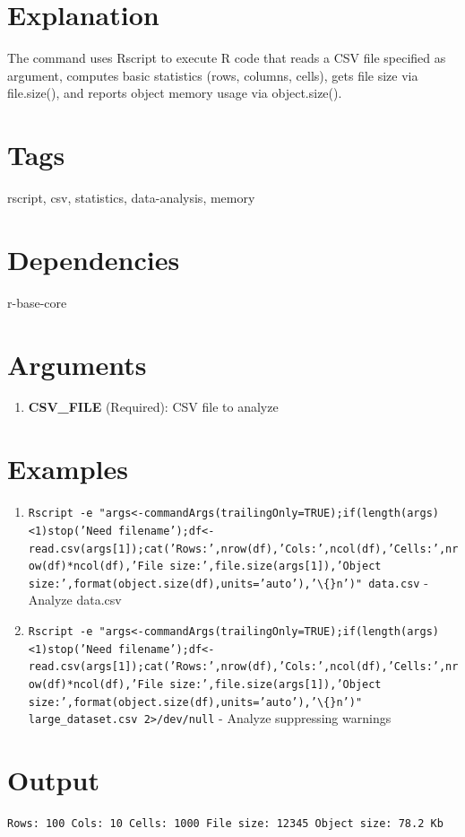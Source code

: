 \documentclass[openany]{book}
\begin{document}
\section*{Explanation}
The command uses Rscript to execute R code that reads a CSV file specified as argument, computes basic statistics (rows, columns, cells), gets file size via file.size(), and reports object memory usage via object.size().

\section*{Tags}
rscript, csv, statistics, data-analysis, memory

\section*{Dependencies}
r-base-core


\section*{Arguments}
\begin{enumerate}
  \item \textbf{CSV\_FILE} (Required): CSV file to analyze
\end{enumerate}

\section*{Examples}
\begin{enumerate}
  \item \texttt{Rscript -e "args<-commandArgs(trailingOnly=TRUE);if(length(args)<1)stop('Need filename');df<-read.csv(args[1]);cat('Rows:',nrow(df),'Cols:',ncol(df),'Cells:',nrow(df)*ncol(df),'File size:',file.size(args[1]),'Object size:',format(object.size(df),units='auto'),'\textbackslash\{\}n')" data.csv} - Analyze data.csv
  \item \texttt{Rscript -e "args<-commandArgs(trailingOnly=TRUE);if(length(args)<1)stop('Need filename');df<-read.csv(args[1]);cat('Rows:',nrow(df),'Cols:',ncol(df),'Cells:',nrow(df)*ncol(df),'File size:',file.size(args[1]),'Object size:',format(object.size(df),units='auto'),'\textbackslash\{\}n')" large\_dataset.csv 2>/dev/null} - Analyze suppressing warnings
\end{enumerate}

\section*{Output}
\begin{lstlisting}
Rows: 100 Cols: 10 Cells: 1000 File size: 12345 Object size: 78.2 Kb

\end{lstlisting}
\end{document}
